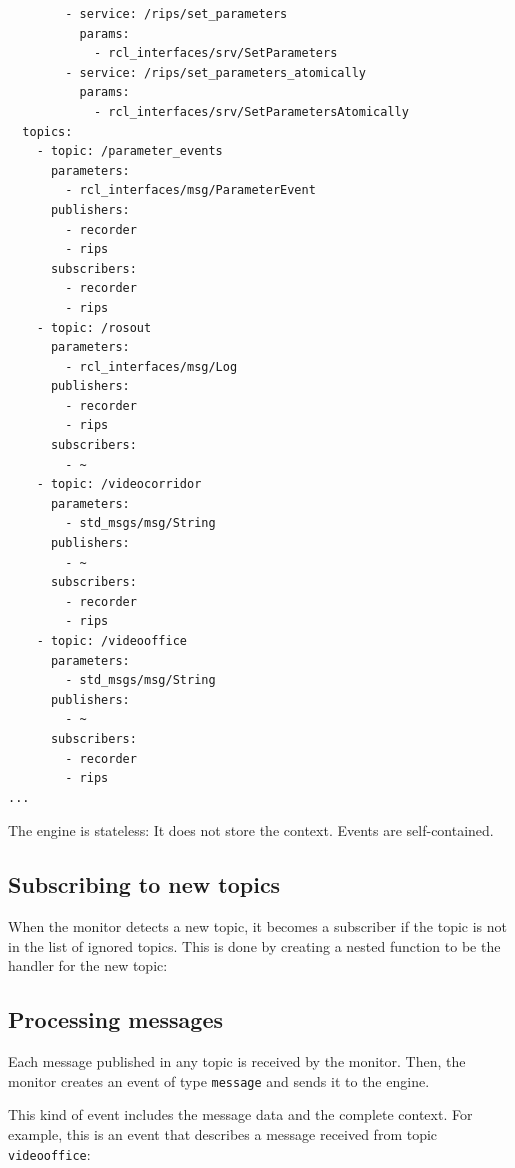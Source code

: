 \documentclass[a4paper]{article}
\begin{document}
{\begin{verbatim}
        - service: /rips/set_parameters
          params:
            - rcl_interfaces/srv/SetParameters
        - service: /rips/set_parameters_atomically
          params:
            - rcl_interfaces/srv/SetParametersAtomically
  topics:
    - topic: /parameter_events
      parameters:
        - rcl_interfaces/msg/ParameterEvent
      publishers:
        - recorder
        - rips
      subscribers:
        - recorder
        - rips
    - topic: /rosout
      parameters:
        - rcl_interfaces/msg/Log
      publishers:
        - recorder
        - rips
      subscribers:
        - ~
    - topic: /videocorridor
      parameters:
        - std_msgs/msg/String
      publishers:
        - ~
      subscribers:
        - recorder
        - rips
    - topic: /videooffice
      parameters:
        - std_msgs/msg/String
      publishers:
        - ~
      subscribers:
        - recorder
        - rips
...
\end{verbatim}
}

The engine is stateless: It does not store the context. Events
are self-contained.

\subsection{Subscribing to new topics}


When the monitor detects a new topic, it becomes a subscriber
if the topic is not in the list of ignored topics.
This is done by creating a nested function to be the handler
for the new topic:



\subsection{Processing messages}


Each message published in any topic is received by the monitor.
Then, the monitor creates an event of type \texttt{message}
and sends it to the engine.

This kind of event includes
the message data and the complete context.
For example, this is an event that describes a message received
from topic \texttt{videooffice}:
\end{document}
